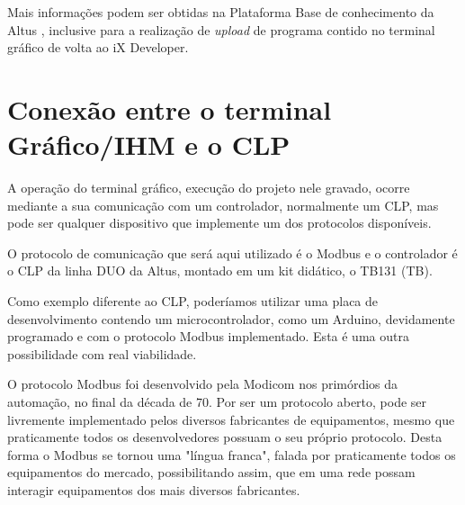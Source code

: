 \begin{figure}[ht!]
	\centering
\end{figure}


Mais informações podem ser obtidas na Plataforma Base de conhecimento da Altus \cite{ixdev_download}, inclusive para a realização de \textit{upload} de programa contido no terminal gráfico de volta ao iX Developer.  






\section{Conexão entre o terminal Gráfico/IHM e o CLP}

A operação do terminal gráfico, execução do projeto nele gravado, ocorre mediante a sua comunicação com um controlador, normalmente um \acrshort{CLP}, mas pode ser qualquer dispositivo que implemente um dos protocolos disponíveis. 

O protocolo de comunicação que será aqui utilizado é o Modbus e o controlador é o \acrshort{CLP} da linha DUO da Altus, montado em um kit didático, o \acrshort{TB}131 (\acrlong{TB}). 

Como exemplo diferente ao \acrshort{CLP}, poderíamos utilizar uma placa de desenvolvimento contendo um microcontrolador, como um Arduino, devidamente programado e com o protocolo Modbus implementado. Esta é uma outra possibilidade com real viabilidade. 

O protocolo Modbus foi desenvolvido pela Modicom nos primórdios da automação, no final da década de 70. 
Por ser um protocolo aberto, pode ser livremente implementado pelos diversos fabricantes de equipamentos, mesmo que praticamente todos os desenvolvedores possuam o seu próprio protocolo. 
Desta forma o Modbus se tornou uma "língua franca", falada por praticamente todos os equipamentos do mercado, possibilitando assim, que em uma rede possam interagir equipamentos dos mais diversos fabricantes. 

